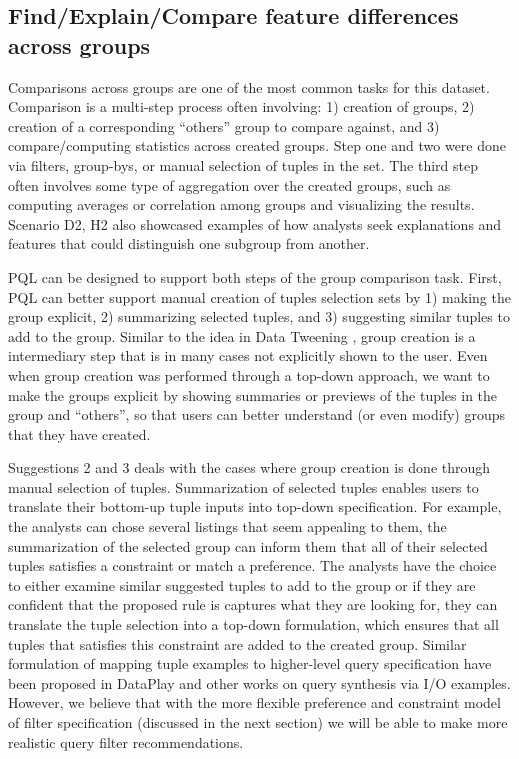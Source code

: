 \documentclass{sig-alternate-05-2015}
\begin{document}
\subsection{Find/Explain/Compare feature differences across groups}
  Comparisons across groups are one of the most common tasks for this dataset. Comparison is a multi-step process often involving: 1) creation of groups, 2) creation of a corresponding ``others'' group to compare against, and 3) compare/computing statistics across created groups. Step one and two were done via filters, group-bys, or manual selection of tuples in the set. The third step often involves some type of aggregation over the created groups, such as computing averages or correlation among groups and visualizing the results. Scenario D2, H2 also showcased examples of how analysts seek explanations and features that could distinguish one subgroup from another. 
  \par PQL can be designed to support both steps of the group comparison task. First, PQL can better support manual creation of tuples selection sets by 1) making the group explicit, 2) summarizing selected tuples, and 3) suggesting similar tuples to add to the group. Similar to the idea in Data Tweening \cite{Khan2017}, group creation is a intermediary step that is in many cases not explicitly shown to the user. Even when group creation was performed through a top-down approach, we want to make the groups explicit by showing summaries or previews of the tuples in the group and ``others'', so that users can better understand (or even modify) groups that they have created.
  \par Suggestions 2 and 3 deals with the cases where group creation is done through manual selection of tuples. Summarization of selected tuples enables users to translate their bottom-up tuple inputs into top-down specification. For example, the analysts can chose several listings that seem appealing to them, the summarization of the selected group can inform them that all of their selected tuples satisfies a constraint or match a preference. The analysts have the choice to either examine similar suggested tuples to add to the group or if they are confident that the proposed rule is captures what they are looking for, they can translate the tuple selection into a top-down formulation, which ensures that all tuples that satisfies this constraint are added to the created group. Similar formulation of mapping tuple examples to higher-level query specification have been proposed in DataPlay\cite{Abouzied2012} and other works on query synthesis via I/O examples\cite{Wang2017,Wang2017a}. However, we believe that with the more flexible preference and constraint model of filter specification (discussed in the next section) we will be able to make more realistic query filter recommendations.
\end{document}
